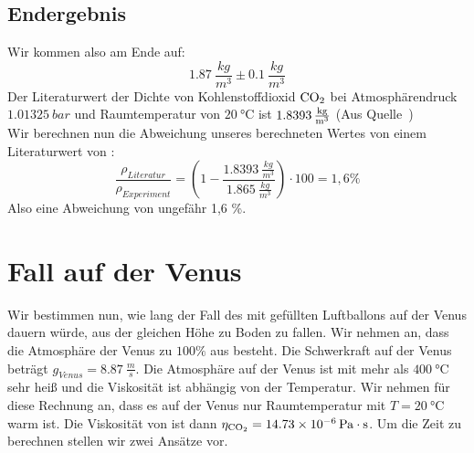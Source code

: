 \documentclass{article}
\begin{document}
      \subsection{Endergebnis}
          Wir kommen also am Ende auf:
          \begin{equation}
              \SI{1.87}{\frac{kg}{m^3}} \pm \SI{0.1}{\frac{kg}{m^3}}
          \end{equation}
          Der Literaturwert der Dichte von Kohlenstoffdioxid \( \ce{CO2} \) bei Atmosphärendruck \(\SI{1.01325 }{bar}\) und Raumtemperatur von \(\SI{20}{\celsius}\) ist \( \SI{1,8393}{ \frac{ \kilogram }{ \metre^3 } } \)
          (Aus Quelle~\cite{co2dichteneu}) \\
          Wir berechnen nun die Abweichung unseres berechneten Wertes von einem Literaturwert von :
          \begin{equation}
              \frac{ \rho_{Literatur}}{\rho_{Experiment}} = \left( 1 - \frac{ \SI{ 1,8393 }{ \frac{kg}{m^3} } }{ \SI{1,865}{ \frac{kg}{m^3} } } \right) \cdot 100 = 1,6 \%
          \end{equation}
          Also eine Abweichung von ungefähr 1,6 \%.
    \section{Fall auf der Venus}
      Wir bestimmen nun, wie lang der Fall des mit  gefüllten Luftballons auf der Venus dauern würde, aus der gleichen Höhe zu Boden zu fallen. Wir nehmen an,
      dass die Atmosphäre der Venus zu \( 100\% \) aus  besteht. Die Schwerkraft auf der Venus beträgt \(g_{Venus} = \SI{8.87}{\frac{m}{s}}\).
      Die Atmosphäre auf der Venus ist mit mehr als \(\SI{400}{\celsius}\) sehr heiß und die Viskosität ist abhängig von der Temperatur.
      Wir nehmen für diese Rechnung an, dass es auf der Venus nur Raumtemperatur mit \(T = \SI{20}{\celsius}\) warm ist.
      Die Viskosität von  ist dann \( \eta_{\ce{CO2}} = \SI{14.73e-6}{\pascal\cdot\second} \).
      Um die Zeit zu berechnen stellen wir zwei Ansätze vor. \\
\end{document}
